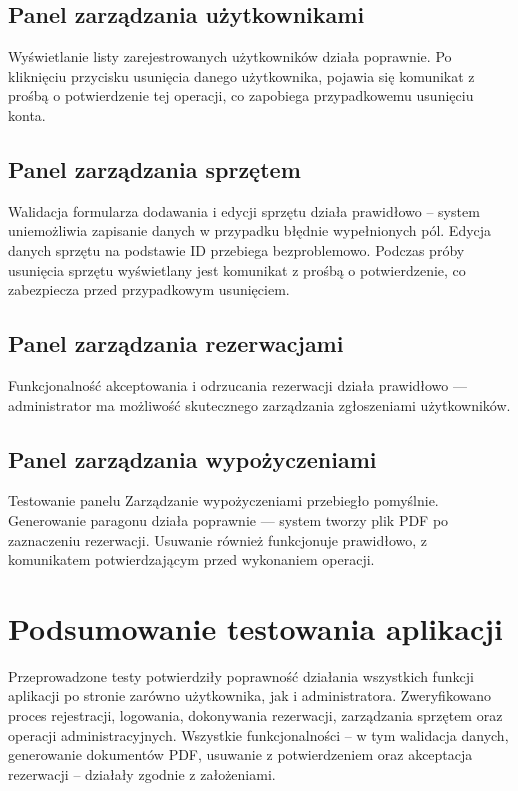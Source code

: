 \subsection{Panel zarządzania użytkownikami}
Wyświetlanie listy zarejestrowanych użytkowników działa poprawnie. Po kliknięciu przycisku usunięcia danego użytkownika, pojawia się komunikat z prośbą o potwierdzenie tej operacji, co zapobiega przypadkowemu usunięciu konta.
\subsection{Panel zarządzania sprzętem}
Walidacja formularza dodawania i edycji sprzętu działa prawidłowo – system uniemożliwia zapisanie danych w przypadku błędnie wypełnionych pól. Edycja danych sprzętu na podstawie ID przebiega bezproblemowo. Podczas próby usunięcia sprzętu wyświetlany jest komunikat z prośbą o potwierdzenie, co zabezpiecza przed przypadkowym usunięciem.
\subsection{Panel zarządzania rezerwacjami}
Funkcjonalność akceptowania i odrzucania rezerwacji działa prawidłowo — administrator ma możliwość skutecznego zarządzania zgłoszeniami użytkowników.
\subsection{Panel zarządzania wypożyczeniami}
Testowanie panelu Zarządzanie wypożyczeniami przebiegło pomyślnie. Generowanie paragonu działa poprawnie — system tworzy plik PDF po zaznaczeniu rezerwacji. Usuwanie również funkcjonuje prawidłowo, z komunikatem potwierdzającym przed wykonaniem operacji.

\section{Podsumowanie testowania aplikacji}
Przeprowadzone testy potwierdziły poprawność działania wszystkich funkcji aplikacji po stronie zarówno użytkownika, jak i administratora. Zweryfikowano proces rejestracji, logowania, dokonywania rezerwacji, zarządzania sprzętem oraz operacji administracyjnych. Wszystkie funkcjonalności – w tym walidacja danych, generowanie dokumentów PDF, usuwanie z potwierdzeniem oraz akceptacja rezerwacji – działały zgodnie z założeniami. 